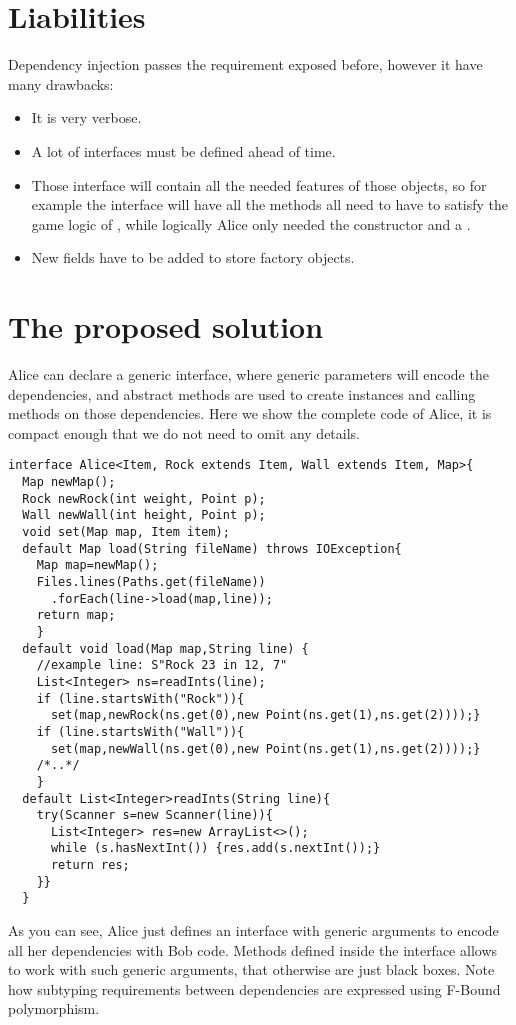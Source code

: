 \documentclass[submission,copyright,creativecommons]{eptcs}
\begin{document}
\section{Liabilities}
Dependency injection passes the requirement exposed before, however it have many
drawbacks:
\begin{itemize}
\item It is very verbose.
\item A lot of interfaces must be defined ahead of time.
\item Those interface will contain all the needed features of those objects,
so for example the \Q@Rock@ interface will have all the methods all \Q@Item@s need
to have to satisfy the game logic of \Q@Bob@, while logically Alice only needed the constructor
and a \Q@toString@.
\item New fields have to be added to store factory objects.
\end{itemize}


\section{The proposed solution}
Alice can declare a generic interface, where generic parameters will encode
the dependencies, and abstract methods are used to create instances and calling
methods on those dependencies.
Here we show the complete code of Alice, it is compact enough that we do
not need to omit any details.

\begin{lstlisting}
interface Alice<Item, Rock extends Item, Wall extends Item, Map>{
  Map newMap();
  Rock newRock(int weight, Point p);
  Wall newWall(int height, Point p);
  void set(Map map, Item item);
  default Map load(String fileName) throws IOException{
    Map map=newMap();
    Files.lines(Paths.get(fileName))
      .forEach(line->load(map,line));
    return map;
    }
  default void load(Map map,String line) {
    //example line: S"Rock 23 in 12, 7"
    List<Integer> ns=readInts(line);
    if (line.startsWith("Rock")){
      set(map,newRock(ns.get(0),new Point(ns.get(1),ns.get(2))));}
    if (line.startsWith("Wall")){
      set(map,newWall(ns.get(0),new Point(ns.get(1),ns.get(2))));}
    /*..*/
    }
  default List<Integer>readInts(String line){
    try(Scanner s=new Scanner(line)){
      List<Integer> res=new ArrayList<>();
      while (s.hasNextInt()) {res.add(s.nextInt());}
      return res;
    }}
  }
\end{lstlisting}
As you can see, Alice just defines an interface with generic arguments
to encode all her dependencies with Bob code.
Methods defined inside the \Q@Alice@ interface allows to work with such 
generic arguments, that otherwise are just black boxes.
Note how subtyping requirements between dependencies are expressed
using F-Bound polymorphism.
\end{document}
